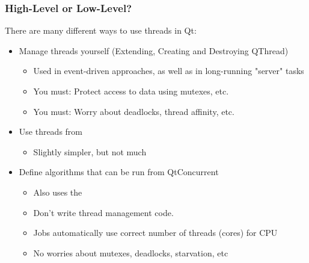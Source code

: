 \begin{slide}
\frametitle{High-Level or Low-Level?}
There are many different ways to use threads in Qt: 
\begin{itemize}
\item Manage threads yourself (Extending, Creating and Destroying QThread)
    \begin{itemize}
        \item Used in event-driven approaches, as well as in long-running
        "server" tasks 
        \item You must: Protect access to data using mutexes, etc.
        \item You must: Worry about deadlocks, thread affinity, etc.
    \end{itemize} 
\item Use threads from 
    \begin{itemize}
        \item Slightly simpler, but not much
    \end{itemize}
\item Define algorithms that can be run from QtConcurrent
    \begin{itemize}
    \item Also uses the  
    \item Don't write thread management code.
    \item Jobs automatically use correct number of threads (cores) for CPU
    \item No worries about mutexes, deadlocks, starvation, etc
    \end{itemize}
\end{itemize}
\end{slide}

